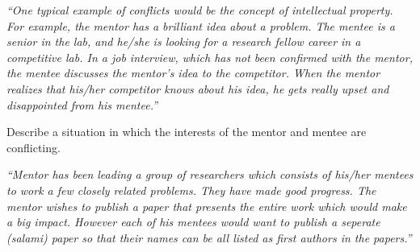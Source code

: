 \documentclass[portrait,11pt]{seminar}
\begin{document}
{\it ``One typical example of conflicts would be the concept of intellectual property. For example, the mentor has a brilliant idea about a problem. The mentee is a senior in
the lab, and he/she is looking for a research fellow career in a competitive lab. In a job interview, which has not been confirmed with the mentor, the mentee discusses the mentor’s idea to the competitor. When the mentor realizes that his/her competitor knows about his idea, he gets really upset and disappointed from his mentee.''}






 \es \bs

\es

\bs

  Describe a situation in which the interests of the mentor and mentee are 
conflicting. 

{\it ``Mentor has been leading a group of researchers which consists of his/her mentees to work a few closely related problems. They have made good progress. The mentor wishes to publish a paper that presents the entire work which would make a big impact. However each of his mentees would want to publish a seperate (salami) paper so that their names can be all listed as first authors in the papers.''}
\end{document}
